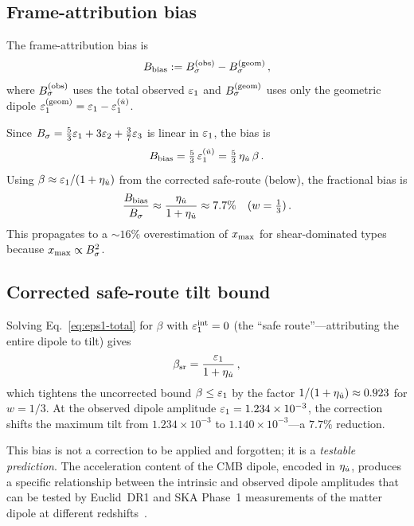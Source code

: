 \subsection{Frame-attribution bias}\label{sec:frame-bias}

\begin{definition}
\label{def:frame-bias}
The frame-attribution bias is
\begin{equation}\label{eq:frame-bias}
B_{\mathrm{bias}} := B_\sigma^{(\mathrm{obs})} - B_\sigma^{(\mathrm{geom})}\,,
\end{equation}
where $B_\sigma^{(\mathrm{obs})}$ uses the total observed
$\varepsilon_1$ and $B_\sigma^{(\mathrm{geom})}$ uses only the
geometric dipole $\varepsilon_1^{(\mathrm{geom})}
= \varepsilon_1 - \varepsilon_1^{(\dot{u})}$.
\end{definition}

Since $B_\sigma = \frac{5}{3}\varepsilon_1 + 3\varepsilon_2 + \frac{3}{7}\varepsilon_3$
is linear in $\varepsilon_1$, the bias is
\begin{equation}
B_{\mathrm{bias}} = \tfrac{5}{3}\,\varepsilon_1^{(\dot{u})}
= \tfrac{5}{3}\,\eta_{\dot{u}}\,\beta\,.
\end{equation}
Using $\beta \approx \varepsilon_1/(1+\eta_{\dot{u}})$ from the corrected
safe-route (below), the fractional bias is
\begin{equation}
\frac{B_{\mathrm{bias}}}{B_\sigma}
\approx \frac{\eta_{\dot{u}}}{1 + \eta_{\dot{u}}}
\approx 7.7\% \quad (w = \tfrac{1}{3})\,.
\end{equation}
This propagates to a $\sim 16\%$ overestimation of $x_{\max}$ for
shear-dominated types because $x_{\max} \propto B_\sigma^2$.

\subsection{Corrected safe-route tilt bound}
\label{sec:safe-route}
\label{sec:corrected-bound}

Solving Eq.~\eqref{eq:eps1-total} for $\beta$ with
$\varepsilon_1^{\mathrm{int}} = 0$ (the ``safe route''---attributing
the entire dipole to tilt) gives
\begin{equation}\label{eq:beta-sr}
\beta_{\mathrm{sr}} = \frac{\varepsilon_1}{1 + \eta_{\dot{u}}}\,,
\end{equation}
which tightens the uncorrected bound $\beta \leq \varepsilon_1$ by
the factor $1/(1 + \eta_{\dot{u}}) \approx 0.923$ for $w = 1/3$.
At the observed dipole amplitude
$\varepsilon_1 = 1.234 \times 10^{-3}$, the correction shifts the
maximum tilt from $1.234 \times 10^{-3}$ to
$1.140 \times 10^{-3}$---a $7.7\%$ reduction.

This bias is not a correction to be applied and forgotten;
it is a \emph{testable prediction}.  The acceleration content
of the CMB dipole, encoded in $\eta_{\dot{u}}$, produces a specific
relationship between the intrinsic and observed dipole
amplitudes that can be tested by Euclid~DR1 and SKA Phase~1
measurements of the matter dipole at different
redshifts~\cite{TsagasReview2025}.


